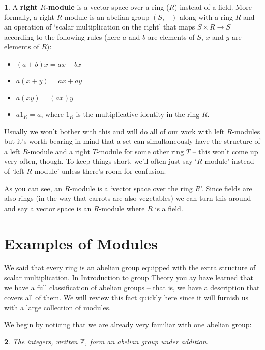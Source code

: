 \documentclass[oneside,english]{amsbook}
\numberwithin{section}{chapter}
\theoremstyle{plain}
\newtheorem{thm}{\protect\theoremname}
\theoremstyle{definition}
\newtheorem{defn}[thm]{\protect\definitionname}
\providecommand{\definitionname}{Definition}
\providecommand{\theoremname}{Theorem}
\begin{document}
			\begin{defn}
				A \textbf{right $R$-module} is a vector space over a ring ($R$) instead of a field. More formally, a right $R$-module is an abelian group $(S, +)$ along with a ring $R$ and an operation of `scalar multiplication on the right' that maps $S\times R\to S$ according to the following rules (here $a$ and $b$ are elements of $S$, $x$ and $y$ are elements of $R$):
				\begin{itemize}
					\item $(a + b)x = ax + bx$ 
					\item $a(x + y) = ax + ay$
					\item $a(xy) = (ax)y$
					\item $a1_R = a$, where $1_R$ is the multiplicative identity in the ring $R$.
				\end{itemize}
			\end{defn}
	
			Usually we won't bother with this and will do all of our work with left $R$-modules but it's worth bearing in mind that a set can simultaneously have the structure of a left $R$-module and a right $T$-module for some other ring $T$ -- this won't come up very often, though. To keep things short, we'll often just say `$R$-module' instead of `left $R$-module' unless there's room for confusion.
			
			As you can see, an $R$-module is a `vector space over the ring $R$'. Since fields are also rings (in the way that carrots are also vegetables) we can turn this around and say a vector space is an $R$-module where $R$ is a field.

		\section{Examples of Modules}

			We said that every ring is an abelian group equipped with the extra structure of scalar multiplication. In Introduction to group Theory you ay have learned that we have a full classification of abelian groups -- that is, we have a description that covers all of them. We will review this fact quickly here since it will furnish us with a large collection of modules. 
			
			We begin by noticing that we are already very familiar with one abelian group:
			
			\begin{thm}
				The integers, written $\mathbb{Z}$, form an abelian group under addition.
			\end{thm}
			
\end{document}
